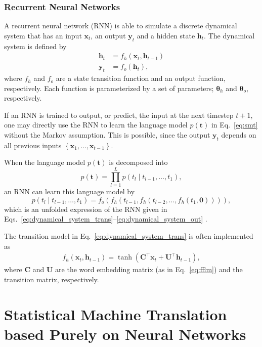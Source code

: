 \documentclass[11pt, oneside]{essay}
\newcommand{\vect}[1]{\mathbf{#1}}
\newcommand{\vects}[1]{\boldsymbol{#1}}
\newcommand{\matr}[1]{\mathbf{#1}}
\newcommand{\vh}[0]{\vect{h}}
\newcommand{\vx}[0]{\vect{x}}
\newcommand{\vy}[0]{\vect{y}}
\newcommand{\vt}[0]{\vect{t}}
\newcommand{\mU}[0]{\matr{U}}
\newcommand{\mC}{\matr{C}}
\newcommand{\vzero}[0]{\vect{0}}
\newcommand{\TT}[0]{{\vects{\theta}}}
\begin{document}
\subsubsection{Recurrent Neural Networks}

A recurrent neural network (RNN) is able to simulate a discrete
dynamical system that has an input $\vx_t$, an output $\vy_t$ and
a hidden state $\vh_t$.  The dynamical system is defined by
\begin{align}
    \label{eq:dynamical_system_trans}
    \vh_t &= f_h(\vx_t, \vh_{t-1}) 
    \\
    \label{eq:dynamical_system_out}
    \vy_t &= f_o(\vh_t),
\end{align}
where $f_h$ and $f_o$ are a state transition function and an
output function, respectively. Each function is parameterized by
a set of parameters; $\TT_h$ and $\TT_o$, respectively. 

If an RNN is trained to output, or predict, the input at the next
timestep $t+1$, one may directly use the RNN to learn the
language model $p(\vt)$ in Eq.~\eqref{eq:smt} without the Markov
assumption. This is possible, since the output $\vy_t$ depends on
all previous inputs $\left\{ \vx_1, \dots, \vx_{t-1} \right\}$.

When the language model $p(\vt)$ is decomposed into
\[
    p(\vt) = \prod_{l=1}^L p(t_l \mid t_{l-1}, \dots, t_1),
\]
an RNN can learn this language model by 
\[
    p(t_l \mid t_{l-1}, \dots, t_1) = f_o(f_h(t_{l-1},
    f_h(t_{l-2}, \dots, f_h(t_1, \vzero)))),
\]
which is an unfolded expression of the RNN given in
Eqs.~\eqref{eq:dynamical_system_trans}--\eqref{eq:dynamical_system_out}
\citep{Mikolov2010}.

The transition model in Eq.~\eqref{eq:dynamical_system_trans} is
often implemented as
\begin{align}
\label{eq:rnn_simple_trans}
f_h(\vx_t, \vh_{t-1}) = \tanh\left( \mC^\top \vx_t + \mU^\top
        \vh_{t-1}\right),
\end{align}
where $\mC$ and $\mU$ are the word embedding matrix (as in
Eq.~\eqref{eq:fflm}) and the transition matrix, respectively.




\section{Statistical Machine Translation based Purely on Neural Networks}
\label{sec:new_approach}
\end{document}
